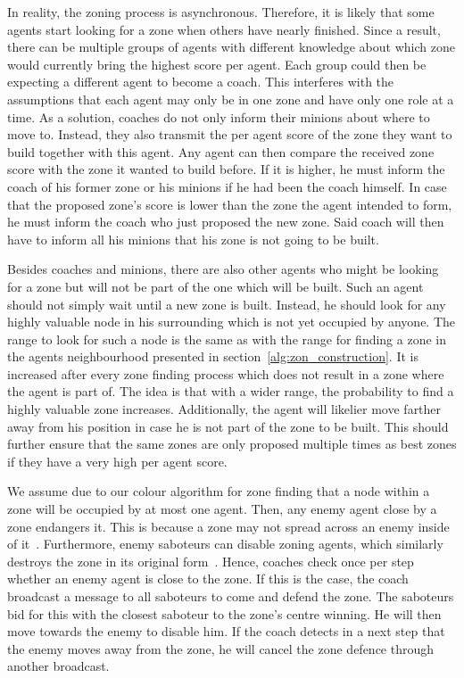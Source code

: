 In reality, the zoning process is asynchronous. Therefore, it is likely that some agents start looking for a zone when others have nearly finished. Since a result, there can be multiple groups of agents with different knowledge about which zone would currently bring the highest score per agent. Each group could then be expecting a different agent to become a coach. This interferes with the assumptions that each agent may only be in one zone and have only one role at a time. As a solution, coaches do not only inform their minions about where to move to. Instead, they also transmit the per agent score of the zone they want to build together with this agent. Any agent can then compare the received zone score with the zone it wanted to build before. If it is higher, he must inform the coach of his former zone or his minions if he had been the coach himself. In case that the proposed zone's score is lower than the zone the agent intended to form, he must inform the coach who just proposed the new zone. Said coach will then have to inform all his minions that his zone is not going to be built.

Besides coaches and minions, there are also other agents who might be looking for a zone but will not be part of the one which will be built. Such an agent should not simply wait until a new zone is built. Instead, he should look for any highly valuable node in his surrounding which is not yet occupied by anyone. The range to look for such a node is the same as with the range for finding a zone in the agents neighbourhood presented in section~\ref{alg:zon_construction}. It is increased after every zone finding process which does not result in a zone where the agent is part of. The idea is that with a wider range, the probability to find a highly valuable zone increases. Additionally, the agent will likelier move farther away from his position in case he is not part of the zone to be built. This should further ensure that the same zones are only proposed multiple times as best zones if they have a very high per agent score.

We assume due to our colour algorithm for zone finding that a node within a zone will be occupied by at most one agent. Then, any enemy agent close by a zone endangers it. This is because a zone may not spread across an enemy inside of it~\cite{ahlbrecht_mapc_2014}. %
Furthermore, enemy saboteurs can disable zoning agents, which similarly destroys the zone in its original form~\cite{ahlbrecht_mapc_2014}. %
Hence, coaches check once per step whether an enemy agent is close to the zone. If this is the case, the coach broadcast a message to all saboteurs to come and defend the zone. The saboteurs bid for this with the closest saboteur to the zone's centre winning. He will then move towards the enemy to disable him. If the coach detects in a next step that the enemy moves away from the zone, he will cancel the zone defence through another broadcast.


